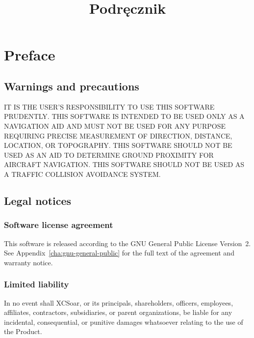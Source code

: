 \documentclass[a4paper,11pt]{refrep}
\title{Podręcznik}
\begin{document}
\maketitle

\listoftodos
 


\chapter*{Preface}

\section*{Warnings and precautions}

\warning IT IS THE USER'S RESPONSIBILITY TO USE THIS SOFT\-WARE PRUDENTLY. THIS SOFTWARE IS 
INTENDED TO BE USED ONLY AS A NAVIGATION AID AND MUST NOT BE USED FOR ANY PURPOSE REQUIRING 
PRECISE MEASURE\-MENT OF DIRECTION, DISTANCE, LOCATION, OR TOPO\-GRAPHY. THIS SOFTWARE SHOULD 
NOT BE USED AS AN AID TO DETERMINE GROUND PROXIMITY FOR AIRCRAFT NAVIGATION. THIS SOFTWARE 
SHOULD NOT BE USED AS A TRAFFIC COLLISION AVOIDANCE SYSTEM.


\section*{Legal notices}

\subsection*{Software license agreement}

This software is released according to the GNU General Public License
Version~2.  See Appendix~\ref{cha:gnu-general-public} for the full
text of the agreement and warranty notice.

\subsection*{Limited liability}

In no event shall XCSoar, or its principals, shareholders, officers,
employees, affiliates, contractors, subsidiaries, or parent
organizations, be liable for any incidental, consequential, or
punitive damages whatsoever relating to the use of the Product.
\end{document}
